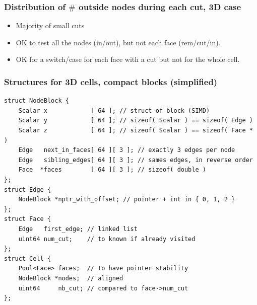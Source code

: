 \documentclass[aspectratio=169]{beamer}
\begin{document}
\begin{frame}
    \frametitle{Distribution of $\#$ outside nodes during each cut, 3D case}

    \begin{minipage}[c][0.6\textheight][c]{0.4\textwidth}
        
    \end{minipage}
    \textwidth
    \begin{minipage}{0.55\textwidth}
        \begin{itemize}
            \item Majority of small cuts

            \bigskip
            \item OK to test all the nodes (in/out), but not each face (rem/cut/in).

            \bigskip
            \item OK for a switch/case for each face with a cut but not for the whole cell.
        \end{itemize}
    \end{minipage}
\end{frame}

\begin{frame}[fragile]
    \frametitle{Structures for 3D cells, compact blocks (simplified)}

    \begin{footnotesize}
    \begin{lstlisting} 
struct NodeBlock {
    Scalar x            [ 64 ]; // struct of block (SIMD)
    Scalar y            [ 64 ]; // sizeof( Scalar ) == sizeof( Edge )
    Scalar z            [ 64 ]; // sizeof( Scalar ) == sizeof( Face * )
    Edge   next_in_faces[ 64 ][ 3 ]; // exactly 3 edges per node 
    Edge   sibling_edges[ 64 ][ 3 ]; // sames edges, in reverse order
    Face  *faces        [ 64 ][ 3 ]; // sizeof( double )
};
struct Edge {
    NodeBlock *nptr_with_offset; // pointer + int in { 0, 1, 2 }
};
struct Face {
    Edge   first_edge; // linked list
    uint64 num_cut;    // to known if already visited
};
struct Cell {
    Pool<Face> faces;  // to have pointer stability
    NodeBlock *nodes;  // aligned
    uint64     nb_cut; // compared to face->num_cut
};
    \end{lstlisting}
    \end{footnotesize}
\end{frame}

\end{document}

